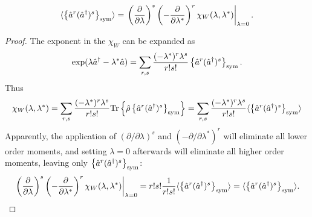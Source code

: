 \begin{lemma}
\label{lmm:formalism:sm-wigner:moments-from-chi}
\[
	\langle \left\{  \hat{a}^r (\hat{a}^\dagger)^s  \right\}_{\mathrm{sym}} \rangle
	= \left.
		\left( \frac{\partial}{\partial \lambda} \right)^s
		\left( -\frac{\partial}{\partial \lambda^*} \right)^r
		\chi_W (\lambda, \lambda^*)
	\right|_{\lambda=0}.
\]
\end{lemma}
\begin{proof}
The exponent in the $\chi_W$ can be expanded as
\[
	\exp (\lambda \hat{a}^\dagger - \lambda^* \hat{a})
	= \sum\limits_{r,s}
		\frac{(-\lambda^*)^r \lambda^s}{r!s!}
		\left\{  \hat{a}^r (\hat{a}^\dagger)^s  \right\}_{\mathrm{sym}}.
\]
Thus
\[
	\chi_W(\lambda, \lambda^*)
	= \sum\limits_{r,s}
		\frac{(-\lambda^*)^r \lambda^s}{r!s!}
		\mathrm{Tr} \left\{ 
			\hat{\rho} \left\{  \hat{a}^r (\hat{a}^\dagger)^s  \right\}_{\mathrm{sym}}
		 \right\}
	= \sum\limits_{r,s}
		\frac{(-\lambda^*)^r \lambda^s}{r!s!}
		\langle \left\{  \hat{a}^r (\hat{a}^\dagger)^s  \right\}_{\mathrm{sym}} \rangle
\]
Apparently, the application of $(\partial / \partial \lambda)^s$ and $(-\partial / \partial \lambda^*)^r$ will eliminate all lower order moments,
and setting $\lambda = 0$ afterwards will eliminate all higher order moments,
leaving only $\left\{  \hat{a}^r (\hat{a}^\dagger)^s  \right\}_{\mathrm{sym}}$:
\[
	\left.
		\left( \frac{\partial}{\partial \lambda} \right)^s
		\left( -\frac{\partial}{\partial \lambda^*} \right)^r
		\chi_W (\lambda, \lambda^*)
	\right|_{\lambda=0}
	= r! s! \frac{1}{r! s!}
		\langle \left\{  \hat{a}^r (\hat{a}^\dagger)^s  \right\}_{\mathrm{sym}} \rangle
	= \langle \left\{  \hat{a}^r (\hat{a}^\dagger)^s  \right\}_{\mathrm{sym}} \rangle.
	\qedhere
\]
\end{proof}

